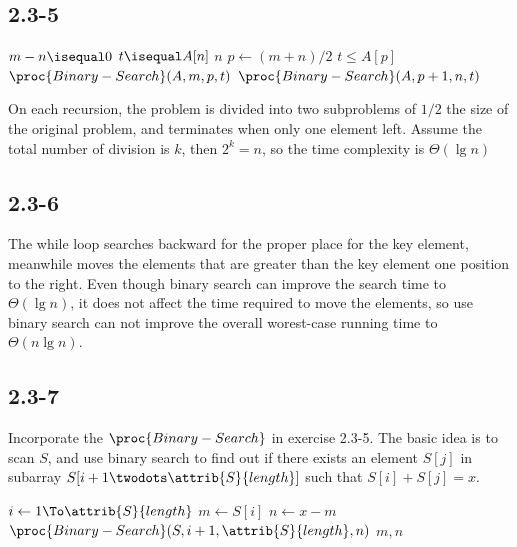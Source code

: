 \documentclass[a4paper, 11pt]{report}
\begin{document}
				\subsection{2.3-5}
					\begin{codebox}
					\li	\If $m-n \isequal 0$
						\Then
					\li		\If $t \isequal A[n]$
							\Then
					\li			\Return $n$
					\li		\Else
					\li			\Return {}
							\End
						\End
					\li	$p \gets (m+n)/2$
					\li \If $t \le A[p]$
						\Then
					\li		\Return $\proc{Binary-Search}(A,m,p,t)$
					\li	\Else
					\li		\Return $\proc{Binary-Search}(A,p+1,n,t)$
						\End
					\end{codebox}
					On each recursion, the problem is divided into two subproblems of $1/2$ the size of the original problem, and
					terminates when only one element left. Assume the total number of division is $k$, then $2^k=n$, so the time 
					complexity is $\Theta(\lg n)$
				\subsection{2.3-6}
					The while loop searches backward for the proper place for the key element, meanwhile moves the elements that are
					greater than the key element one position to the right. Even though binary search can improve the search time
					to $\Theta(\lg n)$, it does not affect the time required to move the elements, so use binary search can not
					improve the overall worest-case running time to $\Theta(n\lg n)$.
				\subsection{2.3-7}
					Incorporate the $\proc{Binary-Search}$ in exercise 2.3-5. The basic idea is to scan $S$, and use binary search 
					to find out if there exists an element $S[j]$ in subarray $S[i+1\twodots \attrib{S}{length}]$ such that 
					$S[i]+S[j]=x$.
					\begin{codebox}
						\Procname{$\proc{Addition-Search}$}
						\li	\For $i \gets 1 \To \attrib{S}{length}$
							\Do
						\li		$m \gets S[i]$
						\li		$n \gets x - m$
						\li		\If $\proc{Binary-Search}(S, i+1, \attrib{S}{length}, n)$
								\Then
						\li			\Return $m, n$
						\li		\Else
						\li			\Return \const{nil}
								\End
							\End
					\end{codebox}
					
\end{document}
